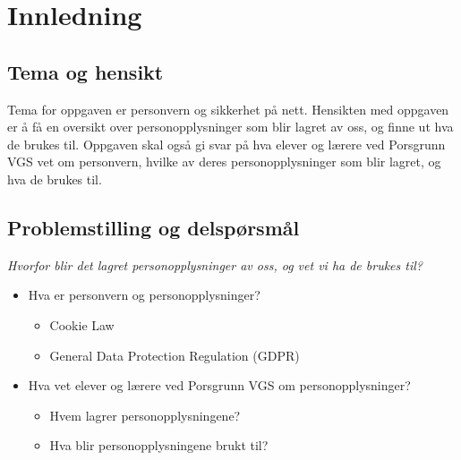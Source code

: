 \section{Innledning}

\subsection{Tema og hensikt}
Tema for oppgaven er personvern og sikkerhet på nett. Hensikten med oppgaven er å få en oversikt over personopplysninger som blir lagret av oss, og finne ut hva de brukes til. Oppgaven skal også gi svar på hva elever og lærere ved Porsgrunn VGS vet om personvern, hvilke av deres personopplysninger som blir lagret, og hva de brukes til.

\subsection{Problemstilling og delspørsmål}\label{subsec:problemstilling}

\textit{Hvorfor blir det lagret personopplysninger av oss, og vet vi ha de brukes til?}

\begin{itemize}
    \item Hva er personvern og personopplysninger?
    \begin{itemize}
        \item Cookie Law
        \item General Data Protection Regulation (GDPR)
    \end{itemize}
    \item Hva vet elever og lærere ved Porsgrunn VGS om personopplysninger?
    \begin{itemize}
        \item Hvem lagrer personopplysningene?
        \item Hva blir personopplysningene brukt til?
    \end{itemize}
\end{itemize}


\newpage